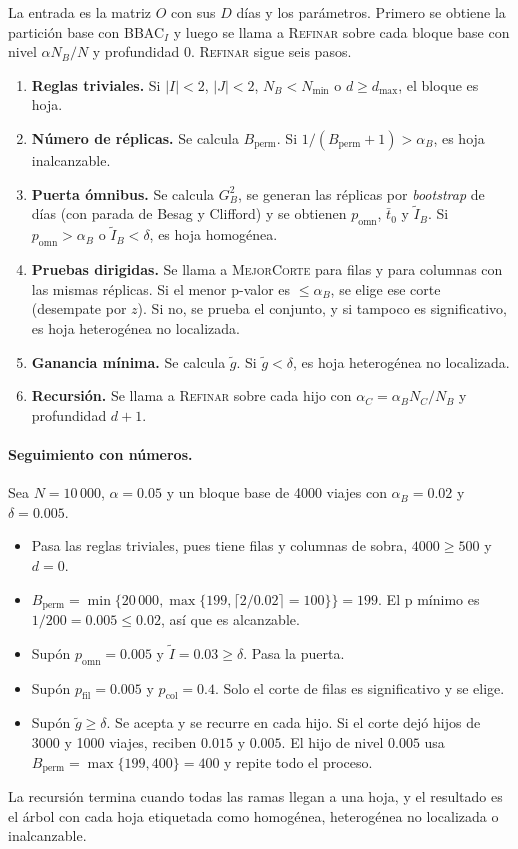 \documentclass[11pt,a4paper]{article}
\begin{document}
La entrada es la matriz $O$ con sus $D$ días y los parámetros. Primero se obtiene la
partición base con BBAC$_I$ y luego se llama a \textsc{Refinar} sobre cada bloque base
con nivel $\alpha N_B/N$ y profundidad 0. \textsc{Refinar} sigue seis pasos.
\begin{enumerate}
\item \textbf{Reglas triviales.} Si $|I|<2$, $|J|<2$, $N_B<N_{\min}$ o
$d\ge d_{\max}$, el bloque es hoja.
\item \textbf{Número de réplicas.} Se calcula $B_{\mathrm{perm}}$. Si
$1/(B_{\mathrm{perm}}+1)>\alpha_B$, es hoja inalcanzable.
\item \textbf{Puerta ómnibus.} Se calcula $G^2_B$, se generan las réplicas por
\emph{bootstrap} de días (con parada de Besag y Clifford) y se obtienen $p_{\mathrm{omn}}$,
$\bar t_0$ y $\tilde I_B$. Si $p_{\mathrm{omn}}>\alpha_B$ o $\tilde I_B<\delta$, es
hoja homogénea.
\item \textbf{Pruebas dirigidas.} Se llama a \textsc{MejorCorte} para filas y para
columnas con las mismas réplicas. Si el menor p-valor es $\le\alpha_B$, se elige ese
corte (desempate por $z$). Si no, se prueba el conjunto, y si tampoco es
significativo, es hoja heterogénea no localizada.
\item \textbf{Ganancia mínima.} Se calcula $\tilde g$. Si $\tilde g<\delta$, es hoja
heterogénea no localizada.
\item \textbf{Recursión.} Se llama a \textsc{Refinar} sobre cada hijo con
$\alpha_C=\alpha_BN_C/N_B$ y profundidad $d+1$.
\end{enumerate}

\paragraph{Seguimiento con números.} Sea $N=10\,000$, $\alpha=0.05$ y un bloque base
de 4000 viajes con $\alpha_B=0.02$ y $\delta=0.005$.
\begin{itemize}
\item Pasa las reglas triviales, pues tiene filas y columnas de sobra, $4000\ge500$ y
$d=0$.
\item $B_{\mathrm{perm}}=\min\{20\,000,\max\{199,\lceil2/0.02\rceil=100\}\}=199$. El
p mínimo es $1/200=0.005\le0.02$, así que es alcanzable.
\item Supón $p_{\mathrm{omn}}=0.005$ y $\tilde I=0.03\ge\delta$. Pasa la puerta.
\item Supón $p_{\mathrm{fil}}=0.005$ y $p_{\mathrm{col}}=0.4$. Solo el corte de filas
es significativo y se elige.
\item Supón $\tilde g\ge\delta$. Se acepta y se recurre en cada hijo. Si el corte dejó
hijos de 3000 y 1000 viajes, reciben $0.015$ y $0.005$. El hijo de nivel $0.005$ usa
$B_{\mathrm{perm}}=\max\{199,400\}=400$ y repite todo el proceso.
\end{itemize}
La recursión termina cuando todas las ramas llegan a una hoja, y el resultado es el
árbol con cada hoja etiquetada como homogénea, heterogénea no localizada o
inalcanzable.
\end{document}
